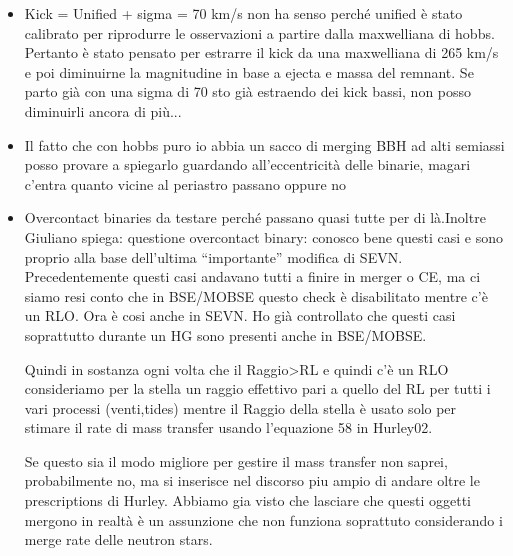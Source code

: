 \documentclass[a4paper,titlepage]{book}     	%
\begin{document}
 
\begin{itemize}
	\item Kick = Unified + sigma = 70 km/s non ha senso perché unified è stato calibrato per riprodurre le osservazioni a partire dalla maxwelliana di hobbs. Pertanto è stato pensato per estrarre il kick da una maxwelliana di 265 km/s e poi diminuirne la magnitudine in base a ejecta e massa del remnant. Se parto già con una sigma di 70 sto già estraendo dei kick bassi, non posso diminuirli ancora di più...
	\item Il fatto che con hobbs puro io abbia un sacco di merging BBH ad alti semiassi posso provare a spiegarlo guardando all'eccentricità delle binarie, magari c'entra quanto vicine al periastro passano oppure no
	\item Overcontact binaries da testare perché passano quasi tutte per di là.Inoltre Giuliano spiega: questione overcontact binary: conosco bene questi casi e sono proprio alla base dell’ultima “importante” modifica di SEVN. 
	Precedentemente questi casi andavano tutti a finire in merger o CE, ma ci siamo resi conto che in BSE/MOBSE questo check è disabilitato mentre c’è un RLO. Ora è cosi anche in SEVN. 
	Ho già controllato che questi casi soprattutto durante un HG sono presenti anche in BSE/MOBSE. 
	
	Quindi in sostanza ogni volta che il Raggio>RL e quindi c’è un RLO consideriamo per la stella  un raggio effettivo pari a quello del RL per tutti i vari processi (venti,tides) mentre il Raggio della stella è usato 
	solo per stimare il rate di mass transfer usando l’equazione 58 in Hurley02.
	
	Se questo sia il modo migliore per gestire il mass transfer non saprei, probabilmente no, ma si inserisce nel discorso piu ampio di andare oltre le prescriptions di Hurley. 
	Abbiamo gia visto che lasciare che questi oggetti mergono in realtà è un assunzione che non funziona soprattuto considerando i merge rate delle neutron stars. 
	

\end{itemize}
\end{document}
